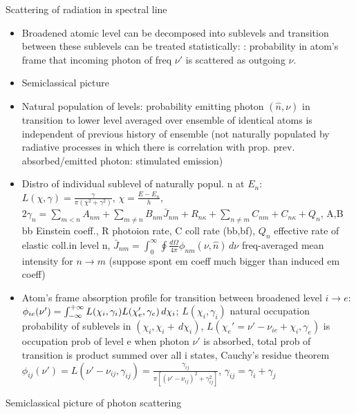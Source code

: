 \begin{frame}{Scattering of radiation in spectral line}
    \begin{itemize}
    \item Broadened atomic level can be decomposed into sublevels and transition between these sublevels can be treated statistically: : probability in atom's frame that incoming photon of freq $\nu'$ is scattered as outgoing $\nu$.
    \item Semiclassical picture
    \item Natural population of levels: probability emitting photon $(\hat{n},\nu)$ in transition to lower level averaged over ensemble of identical atoms is independent of previous history of ensemble (not naturally populated by radiative processes in which there is correlation with prop. prev. absorbed/emitted photon: stimulated emission)
\item Distro of individual sublevel of naturally popul. n at $E_n$: $L(\chi,\gamma)=\frac{\gamma}{\pi(\chi^2+\gamma^2)}$, $\chi=\frac{E-E_n}{h}$, $2\gamma_n=\sum_{m<n}A_{nm}+\sum_{m\neq n}B_{nm}\bar{J}_{nm}+R_{n\kappa}+\sum_{n\neq m}C_{nm}+C_{n\kappa}+Q_n$, A,B bb Einstein coeff., R photoion rate, C coll rate (bb,bf), $Q_n$ effective rate of elastic coll.in level n, $\bar{J}_{nm}=\int_0^{\infty}\oint \frac{d\Omega}{4\pi}\phi_{nm}(\nu,\hat{n})\,d\nu$ freq-averaged mean intensity for $n\to m$ (suppose spont em coeff much bigger than induced em coeff)
\item Atom's frame absorption profile for transition between broadened level $i\to e$: $\phi_{ie}(\nu')=\int_{-\infty}^{+\infty}{}L(\chi_i,\gamma_i)L(\chi_e',\gamma_e)\,d\chi_i$; $L(\chi_i,\gamma_i)$ natural occupation probability of sublevels in $(\chi_i,\chi_i+\,d\chi_i)$, $L(\chi_e'=\nu'-\nu_{ie}+\chi_i,\gamma_e)$ is occupation prob of level e when photon $\nu'$ is absorbed, total prob of transition is product summed over all i states, Cauchy's residue theorem $\phi_{ij}(\nu')=L(\nu'-\nu_{ij},\gamma_{ij})=\frac{\gamma_{ij}}{\pi[(\nu'-\nu_{ij})^2+\gamma_{ij}^2]}$, $\gamma_{ij}=\gamma_i+\gamma_j$
\end{itemize}
\end{frame}

\begin{frame}{Semiclassical picture of photon scattering}
    
\end{frame}

